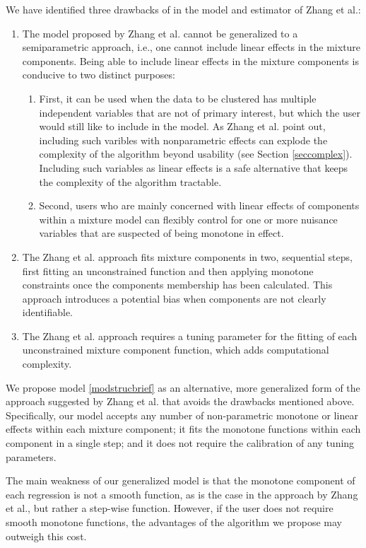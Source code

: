 \documentclass[fleqn,10pt]{olplainarticle}\usepackage[]{graphicx}\usepackage[]{color}
\begin{document}
We have identified three drawbacks of in the model and estimator of Zhang et al.:

\begin{enumerate}[noitemsep] 
  \item The model proposed by Zhang et al. cannot be generalized to a semiparametric approach, i.e., one cannot include linear effects in the mixture components. Being able to include linear effects in the mixture components is conducive to two distinct purposes: 
    \begin{enumerate}[noitemsep]
      \item First, it can be used when the data to be clustered has multiple independent variables that are not of primary interest, but which the user would still like to include in the model. As Zhang et al. point out, including such varibles with nonparametric effects can explode the complexity of the algorithm beyond usability (see Section \ref{seccomplex}). Including such variables as linear effects is a safe alternative that keeps the complexity of the algorithm tractable.
      \item Second, users who are mainly concerned with linear effects of components within a mixture model can flexibly control for one or more nuisance variables that are suspected of being monotone in effect.
    \end{enumerate}
  \item The Zhang et al. approach fits mixture components in two, sequential steps, first fitting an unconstrained function and then applying monotone constraints once the components membership has been calculated. This approach introduces a potential bias when components are not clearly identifiable.
  \item The Zhang et al. approach requires a tuning parameter for the fitting of each unconstrained mixture component function, which adds computational complexity.
\end{enumerate}

We propose model \ref{modstrucbrief} as an alternative, more generalized form of the approach suggested by Zhang et al. that avoids the drawbacks mentioned above. Specifically, our model accepts any number of non-parametric monotone or linear effects within each mixture component; it fits the monotone functions within each component in a single step; and it does not require the calibration of any tuning parameters.

The main weakness of our generalized model is that the monotone component of each regression is not a smooth function, as is the case in the approach by Zhang et al., but rather a step-wise function. However, if the user does not require smooth monotone functions, the advantages of the algorithm we propose may outweigh this cost.
\end{document}
